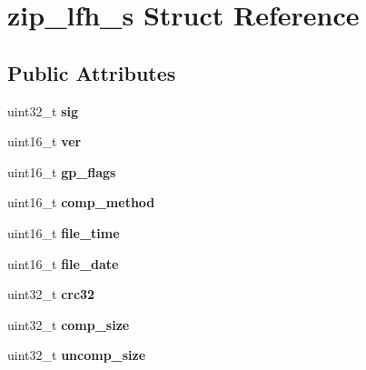 \hypertarget{structzip__lfh__s}{}\section{zip\+\_\+lfh\+\_\+s Struct Reference}
\label{structzip__lfh__s}
\subsection*{Public Attributes}
\begin{DoxyCompactItemize}
\item 
uint32\+\_\+t {\bfseries sig}\hypertarget{structzip__lfh__s_aac0d1be08c445c8f6b16dd27eb38995b}{}\label{structzip__lfh__s_aac0d1be08c445c8f6b16dd27eb38995b}

\item 
uint16\+\_\+t {\bfseries ver}\hypertarget{structzip__lfh__s_a9523ba67477ed69404e8fbe733a67412}{}\label{structzip__lfh__s_a9523ba67477ed69404e8fbe733a67412}

\item 
uint16\+\_\+t {\bfseries gp\+\_\+flags}\hypertarget{structzip__lfh__s_af989b384b80c53303fbdf84cd3ab3306}{}\label{structzip__lfh__s_af989b384b80c53303fbdf84cd3ab3306}

\item 
uint16\+\_\+t {\bfseries comp\+\_\+method}\hypertarget{structzip__lfh__s_a057b7bcfbbdb4e36d080e1aa8736d8d4}{}\label{structzip__lfh__s_a057b7bcfbbdb4e36d080e1aa8736d8d4}

\item 
uint16\+\_\+t {\bfseries file\+\_\+time}\hypertarget{structzip__lfh__s_abe83d3948aa7c9c733618889fd66e55b}{}\label{structzip__lfh__s_abe83d3948aa7c9c733618889fd66e55b}

\item 
uint16\+\_\+t {\bfseries file\+\_\+date}\hypertarget{structzip__lfh__s_a92acab8b356b206424e7f3409ab78162}{}\label{structzip__lfh__s_a92acab8b356b206424e7f3409ab78162}

\item 
uint32\+\_\+t {\bfseries crc32}\hypertarget{structzip__lfh__s_a804c5f7b1f5b67cd01d7e1abec412f24}{}\label{structzip__lfh__s_a804c5f7b1f5b67cd01d7e1abec412f24}

\item 
uint32\+\_\+t {\bfseries comp\+\_\+size}\hypertarget{structzip__lfh__s_a6ca44da670ff5bfc2b656204056891c7}{}\label{structzip__lfh__s_a6ca44da670ff5bfc2b656204056891c7}

\item 
uint32\+\_\+t {\bfseries uncomp\+\_\+size}\hypertarget{structzip__lfh__s_a5bdec53cdd3c85baceeea65172c13fea}{}\label{structzip__lfh__s_a5bdec53cdd3c85baceeea65172c13fea}


\end{DoxyCompactItemize}

